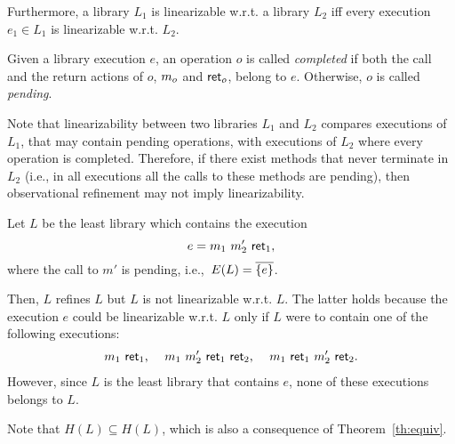 Furthermore, a library $L_1$ is linearizable
w.r.t. a library $L_2$ iff every execution $e_1\in L_1$ is linearizable w.r.t.
$L_2$. %

Given a library execution $e$, an operation $o$ is called \emph{completed} if
both the call and the return actions of $o$, ${m_{o}}$ and ${\mathsf{ret}_{o}}$,
belong to $e$. Otherwise, $o$ is called \emph{pending}.

Note that linearizability between two libraries $L_1$ and $L_2$ compares executions 
of $L_1$, that may contain pending operations, with executions of $L_2$ where every operation 
is completed. Therefore, if there exist methods that never terminate in $L_2$ (i.e., in all executions all the 
calls to these methods are pending), then 
observational refinement may not
imply linearizability. 

\begin{example}
Let $L$ be the least library which contains the execution 
\[
  e = {m_{1}}\ {m'_{2}}\ {\mathsf{ret}_{1}},
\] 
where the call to $m'$ is pending, i.e.,~$E(L) = \overline{{{\{ e \}}}}$.

Then, $L$ refines $L$ but $L$ is not linearizable w.r.t. $L$. The latter holds
because the execution $e$ could be linearizable w.r.t. $L$ only if $L$ were to
contain one of the following executions:
\begin{align*}
  {\ensuremath{m_{1}}}\ {\mathsf{ret}_{1}} \text{, } \quad
  {\ensuremath{m_{1}}}\ {m'_{2}}\ {\mathsf{ret}_{1}}\ {\mathsf{ret}_{2}} \text{, } \quad
  {\ensuremath{m_{1}}}\ {\mathsf{ret}_{1}}\ {m'_{2}}\ {\mathsf{ret}_{2}} \text{.}
\end{align*}
However, since $L$ is the least library that contains $e$, none of these
executions belongs to $L$.

Note that $H(L)\subseteq H(L)$, which is also a consequence of Theorem~\ref{th:equiv}.
\end{example}

%

